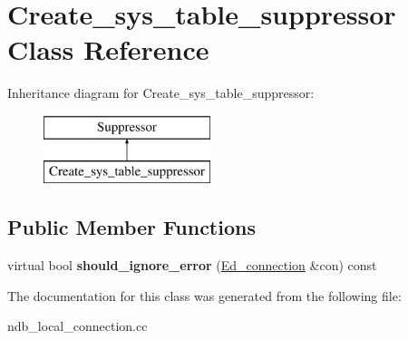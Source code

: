 \hypertarget{classCreate__sys__table__suppressor}{}\section{Create\+\_\+sys\+\_\+table\+\_\+suppressor Class Reference}
\label{classCreate__sys__table__suppressor}
Inheritance diagram for Create\+\_\+sys\+\_\+table\+\_\+suppressor\+:\begin{figure}[H]
\begin{center}
\leavevmode
\includegraphics[height=2.000000cm]{classCreate__sys__table__suppressor}
\end{center}
\end{figure}
\subsection*{Public Member Functions}
\begin{DoxyCompactItemize}
\item 
\mbox{\label{classCreate__sys__table__suppressor_a6bcc3f3c46133d512a656f7a3de48d75}} 
virtual bool {\bfseries should\+\_\+ignore\+\_\+error} (\mbox{\hyperlink{classEd__connection}{Ed\+\_\+connection}} \&con) const
\end{DoxyCompactItemize}


The documentation for this class was generated from the following file\+:\begin{DoxyCompactItemize}
\item 
ndb\+\_\+local\+\_\+connection.\+cc\end{DoxyCompactItemize}

